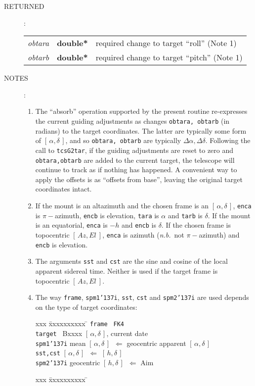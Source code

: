 \documentclass[12pt,fleqn,twoside]{article}
\renewcommand{\_}{{\tt\char'137}}     %
\newcommand{\radec}     {$[\,\alpha,\delta\,]$}
\newcommand{\hadec}     {$[\,h,\delta\,]$}
\newcommand{\azel}      {$[\,Az,El~]$}
\newcommand{\args}[2]
{
  \goodbreak
  \begin{description}
  \item[#1]: \\[1.5ex] \nopagebreak
    \hspace*{-0.9em}
    \begin{tabular}{p{4.5em}p{5.8em}p{23.5em}}
      #2
    \end{tabular}
  \end{description}
  \vspace{-3ex}
}
\newcommand{\spec}[3]
{
  {\em {#1}} & {\bf \mbox{#2}} & {#3}
}
\newcommand{\notes}[1]
{
  \goodbreak
  \begin{description}
    \item[NOTES]: \nopagebreak
        #1
  \end{description}
  \vspace{-3ex}
}
\begin{document}
\args{RETURNED}
{
\spec{obtara}{double*}{required change to target ``roll'' (Note 1)} \\
\spec{obtarb}{double*}{required change to target ``pitch'' (Note 1)}
}
\notes{
\begin{enumerate}
\setlength{\parskip}{\medskipamount}
\item The ``absorb'' operation supported by the present routine
      re-expresses the current guiding adjustments as changes
      {\tt obtara, obtarb} (in radians) to the target coordinates.
      The latter are typically some form of \radec, and so
      {\tt obtara, obtarb} are typically $\Delta\alpha,\Delta\delta$.
      Following the call to {\tt tcsG2tar}, if the guiding adjustments
      are reset to zero and
      {\tt obtara,obtarb} are added to the current target, the
      telescope will continue to track as if nothing has happened.
      A convenient way to apply the offsets is as ``offsets from base'',
      leaving the original target coordinates intact.
\item If the mount is an altazimuth and the chosen frame is an
      \radec, {\tt enca} is $\pi-$azimuth, {\tt encb} is elevation,
      {\tt tara} is $\alpha$ and {\tt tarb} is $\delta$.  If the mount
      is an equatorial, {\tt enca} is $-h$ and {\tt encb} is $\delta$.
      If the chosen frame is topocentric \azel, {\tt enca} is azimuth
      ({\it n.b.}~not $\pi-$azimuth) and {\tt encb} is elevation.
\item The arguments {\tt sst} and {\tt cst} are the sine
      and cosine of the local
      apparent sidereal time.  Neither is used if the target frame is
      topocentric \azel.
\item The way {\tt frame}, {\tt spm1\_i}, {\tt sst}, {\tt cst} and
      {\tt spm2\_i} are used depends on the type of target coordinates:
      \begin{tabbing}
         xxx \= xxxxxxxxxx \= \kill
         \> {\tt frame  } \> {\tt FK4} \\
         \> {\tt target } \> Bxxxx \radec, current date \\
         \> {\tt spm1\_i} \>
                 mean \radec\ $\Leftarrow$ geocentric apparent \radec \\
         \> {\tt sst,cst} \> \radec\ $\Leftarrow$ \hadec \\
         \> {\tt spm2\_i} \>  geocentric \hadec\ $\Leftarrow$ {\sc Aim}
      \end{tabbing}
      \begin{tabbing}
         xxx \= xxxxxxxxxx \= \kill

\end{tabbing}
\end{enumerate}}
\end{document}
